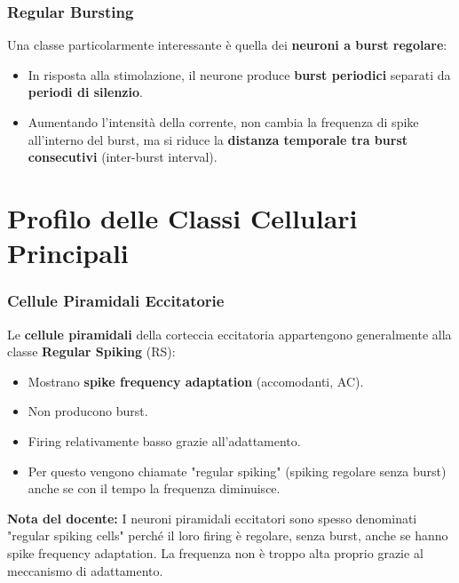 \subsubsection{Regular Bursting}

Una classe particolarmente interessante è quella dei \textbf{neuroni a burst regolare}:

\begin{itemize}
    \item In risposta alla stimolazione, il neurone produce \textbf{burst periodici} separati da \textbf{periodi di silenzio}.
    \item Aumentando l'intensità della corrente, non cambia la frequenza di spike all'interno del burst, ma si riduce la \textbf{distanza temporale tra burst consecutivi} (inter-burst interval).
\end{itemize}

\section{Profilo delle Classi Cellulari Principali}

\subsubsection{Cellule Piramidali Eccitatorie}

Le \textbf{cellule piramidali} della corteccia eccitatoria appartengono generalmente alla classe \textbf{Regular Spiking} (RS):

\begin{itemize}
    \item Mostrano \textbf{spike frequency adaptation} (accomodanti, AC).
    \item Non producono burst.
    \item Firing relativamente basso grazie all'adattamento.
    \item Per questo vengono chiamate "regular spiking" (spiking regolare senza burst) anche se con il tempo la frequenza diminuisce.
\end{itemize}

\begin{tcolorbox}[colback=gray!5, colframe=gray!40, arc=2mm, boxrule=0.5pt]
\textbf{Nota del docente:} I neuroni piramidali eccitatori sono spesso denominati "regular spiking cells" perché il loro firing è regolare, senza burst, anche se hanno spike frequency adaptation. La frequenza non è troppo alta proprio grazie al meccanismo di adattamento.
\end{tcolorbox}

